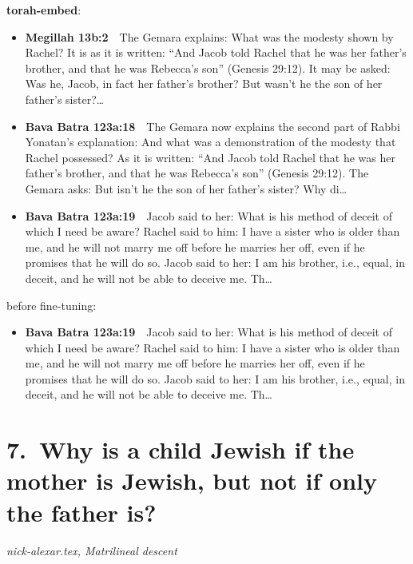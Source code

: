 \documentclass[11pt,a4paper]{article}
\begin{document}
{\color{quiet}\small\textbf{torah-embed}:}
\begin{itemize}[leftmargin=1.2em,itemsep=3pt]
\item {\color{ref}\textbf{Megillah 13b:2}}\ \ The Gemara explains: What was the modesty shown by Rachel? It is as it is written: “And Jacob told Rachel that he was her father’s brother, and that he was Rebecca’s son” (Genesis 29:12). It may be asked: Was he, Jacob, in fact her father’s brother? But wasn’t he the son of her father’s sister?\ldots
\item {\color{ref}\textbf{Bava Batra 123a:18}}\ \ The Gemara now explains the second part of Rabbi Yonatan’s explanation: And what was a demonstration of the modesty that Rachel possessed? As it is written: “And Jacob told Rachel that he was her father’s brother, and that he was Rebecca’s son” (Genesis 29:12). The Gemara asks: But isn’t he the son of her father’s sister? Why di\ldots
\item {\color{ref}\textbf{Bava Batra 123a:19}}\ \ Jacob said to her: What is his method of deceit of which I need be aware? Rachel said to him: I have a sister who is older than me, and he will not marry me off before he marries her off, even if he promises that he will do so. Jacob said to her: I am his brother, i.e., equal, in deceit, and he will not be able to deceive me. Th\ldots
\end{itemize}
{\color{quiet}\small before fine-tuning:}
\begin{itemize}[leftmargin=1.2em]
\item {\color{ref}\textbf{Bava Batra 123a:19}}\ \ Jacob said to her: What is his method of deceit of which I need be aware? Rachel said to him: I have a sister who is older than me, and he will not marry me off before he marries her off, even if he promises that he will do so. Jacob said to her: I am his brother, i.e., equal, in deceit, and he will not be able to deceive me. Th\ldots
\end{itemize}

\section*{7.\ Why is a child Jewish if the mother is Jewish, but not if only the father is?}
{\color{quiet}\small\textit{nick-alexar.tex, Matrilineal descent}}
\end{document}
